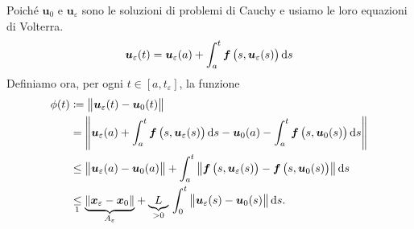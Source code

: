 {\begin{enumerate}
        Poiché $ \bm{u}_0 $ e $ \bm{u}_{ \varepsilon} $ sono le soluzioni di problemi di Cauchy e usiamo le loro equazioni di Volterra. \[
            \bm{u}_{ \varepsilon} (t) =\bm{u}_{ \varepsilon} (a) + \int_{a}^{t} \bm{f}\left(s, \bm{u}_{ \varepsilon}(s)\right) \dif s
        \]Definiamo ora, per ogni $ t \in [a,t_{ \varepsilon} ] $, la funzione \begin{align*}
            \phi(t) &\coloneq \norma{\bm{u}_{ \varepsilon}(t)-\bm{u}_{ 0}(t)}\\ &= \norma{%
            \bm{u}_{ \varepsilon}(a) + \int_{a}^{t} \bm{f}\left(s,\bm{u}_{ \varepsilon}(s)\right) \dif s - \bm{u}_0(a) - \int_{a}^{t} \bm{f}\left(s, \bm{u}_0(s)\right)\dif s 
            }\\ 
            &\le \norma{\bm{u}_{ \varepsilon}(a)-\bm{u}_0(a)} + \int_{a}^{t}\norma{\bm{f}\left(s, \bm{u}_{ \varepsilon}(s)\right) - \bm{f}\left(s, \bm{u}_0(s)\right)}\dif s \\ 
            &\underset{\footnotemark}{\le} \parentesi{A_{ \varepsilon} }{%
                \norma{\bm{x}_{ \varepsilon} -\bm{x}_0} 
            } + \underbrace{L}_{>0}\,\int_{0}^{t}\norma{\bm{u}_{ \varepsilon}(s) - \bm{u}_0(s)}\dif s .
        \end{align*} 


\end{enumerate}}
